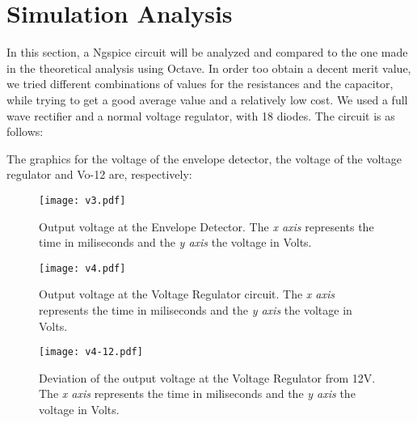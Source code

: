 \newpage
{}
\section{Simulation Analysis}
\label{sec:simulation}

In this section, a Ngspice circuit will be analyzed and compared to the one made in the theoretical analysis using Octave. In order too obtain a decent merit value, we tried different combinations of values for the resistances and the capacitor, while trying to get a good average value and a relatively low cost. We used a full wave rectifier and a normal voltage regulator, with 18 diodes. The circuit is as follows:



The graphics for the voltage of the envelope detector, the voltage of the voltage regulator and Vo-12 are, respectively:

\begin{figure}[H] \centering
\texttt{[image: v3.pdf]}
\caption{Output voltage at the Envelope Detector. The \textit{x axis} represents the time in miliseconds and the \textit{y axis} the voltage in Volts.}
\label{fig:sim_envelope}
\end{figure}

\begin{figure}[H] \centering
\texttt{[image: v4.pdf]}
\caption{Output voltage at the Voltage Regulator circuit. The \textit{x axis} represents the time in miliseconds and the \textit{y axis} the voltage in Volts.}
\label{fig:sim_regulator}
\end{figure}

\begin{figure}[H] \centering
\texttt{[image: v4-12.pdf]}
\caption{Deviation of the output voltage at the Voltage Regulator from 12V. The \textit{x axis} represents the time in miliseconds and the \textit{y axis} the voltage in Volts.}
\label{fig:sim_vo-12}
\end{figure}





